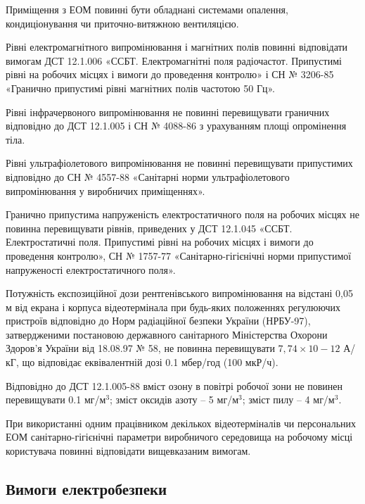 \documentclass[simple,a4paper,14pt,ukrainian,utf8]{eskdtext}
\begin{document}
\begin{appendices}
                Приміщення з ЕОМ повинні бути обладнані системами опалення, кондиціонування чи приточно-витяжною вентиляцією.

                Рівні електромагнітного випромінювання і магнітних полів повинні відповідати вимогам ДСТ 12.1.006 «ССБТ. Електромагнітні поля радіочастот. Припустимі рівні на робочих місцях і вимоги до проведення контролю» і СН № 3206-85 «Гранично припустимі рівні магнітних полів частотою 50 Гц».

                Рівні інфрачервоного випромінювання не повинні перевищувати граничних відповідно до ДСТ 12.1.005 і СН № 4088-86 з урахуванням площі опромінення тіла.

                Рівні ультрафіолетового випромінювання не повинні перевищувати припустимих відповідно до СН № 4557-88 «Санітарні норми ультрафіолетового випромінювання у виробничих приміщеннях».

                Гранично припустима напруженість електростатичного поля на робочих місцях не повинна перевищувати рівнів, приведених у ДСТ 12.1.045 «ССБТ. Електростатичні поля. Припустимі рівні на робочих місцях і вимоги до проведення контролю», СН № 1757-77 «Санітарно-гігієнічні норми припустимої напруженості електростатичного поля».

                Потужність експозиційної дози рентгенівського випромінювання на відстані 0,05 м від екрана і корпуса відеотермінала при будь-яких положеннях регулюючих пристроїв відповідно до Норм радіаційної безпеки України (НРБУ-97), затвердженими постановою державного санітарного Міністерства Охорони Здоров'я України від 18.08.97 № 58, не повинна перевищувати $7,74 \times 10-12$ А/кГ, що відповідає еквівалентній дозі 0.1 мбер/год (100 мкР/ч).

                Відповідно до ДСТ 12.1.005-88 вміст озону в повітрі робочої зони не повинен перевищувати 0.1 мг/м$^{3}$; зміст оксидів азоту -- 5 мг/м$^{3}$; зміст пилу -- 4 мг/м$^{3}$.

                При використанні одним працівником декількох відеотерміналів чи персональних ЕОМ санітарно-гігієнічні параметри виробничого середовища на робочому місці користувача повинні відповідати вищевказаним вимогам.

            \subsection{Вимоги електробезпеки}


\end{appendices}
\end{document}

